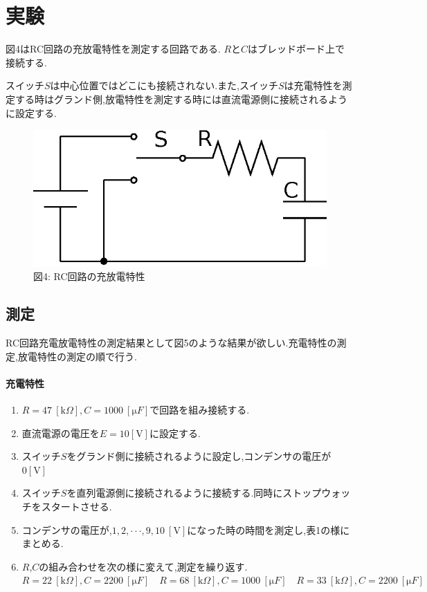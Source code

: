 \documentclass[uplatex]{jsarticle}
\begin{document}
	\section{実験}
		図4はRC回路の充放電特性を測定する回路である. $R$と$C$はブレッドボード上で接続する.\par
		スイッチ$S$は中心位置ではどこにも接続されない.また,スイッチ$S$は充電特性を測定する時はグランド側,放電特性を測定する時には直流電源側に接続されるように設定する.
		\begin{figure}[h]
			\begin{center}
				\includegraphics{4.eps}
			\end{center}
			\captionsetup{labelformat=empty,labelsep=none}
			\caption{図4: RC回路の充放電特性}
		\end{figure}
		\subsection{測定}
			RC回路充電放電特性の測定結果として図5のような結果が欲しい.充電特性の測定,放電特性の測定の順で行う.
			\paragraph{充電特性}
			\begin{enumerate}
				\item{$R = 47 \ [\mathrm k \Omega], C = 1000 \ [\mathrm \mu F]$で回路を組み接続する.}
				\item{直流電源の電圧を$E = 10 [\mathrm V]$に設定する.}
				\item{スイッチ$S$をグランド側に接続されるように設定し,コンデンサの電圧が$0 [\mathrm V]$}
				\item{スイッチ$S$を直列電源側に接続されるように接続する.同時にストップウォッチをスタートさせる.}
				\item{コンデンサの電圧が,$1,2,\cdot\cdot\cdot,9,10 \ [\mathrm V]$になった時の時間を測定し,表1の様にまとめる.}
				\item{$R$,$C$の組み合わせを次の様に変えて,測定を繰り返す.\\
					$R = 22 \ [\mathrm k \Omega], C = 2200 \ [\mathrm \mu F] \quad R = 68 \ [\mathrm k \Omega], C = 1000 \ [\mathrm \mu F] \quad R = 33 \ [\mathrm k \Omega], C = 2200 \ [\mathrm \mu F]$}
			\end{enumerate}
\end{document}
